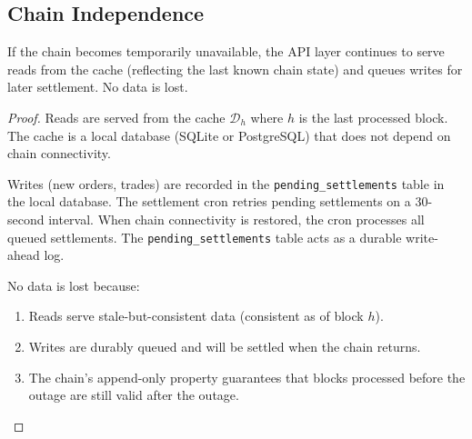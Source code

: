 \subsection{Chain Independence}

\begin{theorem}
\label{thm:independence}
If the chain becomes temporarily unavailable, the API layer continues
to serve reads from the cache (reflecting the last known chain state)
and queues writes for later settlement.  No data is lost.
\end{theorem}

\begin{proof}
Reads are served from the cache $\mathcal{D}_h$ where $h$ is the last
processed block.  The cache is a local database (SQLite or PostgreSQL)
that does not depend on chain connectivity.

Writes (new orders, trades) are recorded in the
\texttt{pending\_settlements} table in the local database.  The
settlement cron retries pending settlements on a 30-second interval.
When chain connectivity is restored, the cron processes all queued
settlements.  The \texttt{pending\_settlements} table acts as a durable
write-ahead log.

No data is lost because:
\begin{enumerate}[nosep]
  \item Reads serve stale-but-consistent data (consistent as of block
        $h$).
  \item Writes are durably queued and will be settled when the chain
        returns.
  \item The chain's append-only property guarantees that blocks
        processed before the outage are still valid after the outage.
\end{enumerate}
\end{proof}

